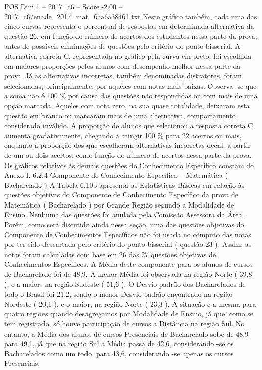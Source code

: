 \begin{textsample}{POS Dim 1 – 2017\_c6 – Score -2.00 – 2017\_c6/enade\_2017\_mat\_67a6a38461.txt}
Neste gráfico também, cada uma das cinco curvas representa o percentual de respostas em determinada alternativa da questão 26, em função do número de acertos dos estudantes nessa parte da prova, antes de possíveis eliminações de questões pelo critério do ponto-bisserial.
A alternativa correta C, representada no gráfico pela curva em preto, foi escolhida em maiores proporções pelos alunos com desempenho melhor nessa parte da prova.
Já as alternativas incorretas, também denominadas distratores, foram selecionadas, principalmente, por aqueles com notas mais baixas.
Observa -se que a soma não é 100 \% por causa das questões não respondidas ou com mais de uma opção marcada.
Aqueles com nota zero, na sua quase totalidade, deixaram esta questão em branco ou marcaram mais de uma alternativa, comportamento considerado inválido.
A proporção de alunos que selecionou a resposta correta C aumenta gradativamente, chegando a atingir 100 \% para 22 acertos ou mais, enquanto a proporção dos que escolheram alternativas incorretas decai, a partir de um ou dois acertos, como função do número de acertos nessa parte da prova.
Os gráficos relativos às demais questões do Conhecimento Específico constam do Anexo I. 6.2.4 Componente de Conhecimento Específico – Matemática ( Bacharelado ) A Tabela 6.10b apresenta as Estatísticas Básicas em relação às questões objetivas do Componente de Conhecimento Específico da prova de Matemática ( Bacharelado ) por Grande Região segundo a Modalidade de Ensino.
Nenhuma das questões foi anulada pela Comissão Assessora da Área.
Porém, como será discutido ainda nessa seção, uma das questões objetivas do Componente de Conhecimentos Específicos não foi usada no cômputo das notas por ter sido descartada pelo critério do ponto-bisserial ( questão 23 ).
Assim, as notas foram calculadas com base em 26 das 27 questões objetivas de Conhecimentos Específicos.
A Média deste componente para os alunos de cursos de Bacharelado foi de 48,9.
A menor Média foi observada na região Norte ( 39,8 ), e a maior, na região Sudeste ( 51,6 ).
O Desvio padrão dos Bacharelados de todo o Brasil foi 21,2, sendo o menor Desvio padrão encontrado na região Nordeste ( 20,1 ), e o maior, na região Norte ( 23,3 ).
A situação é a mesma para quatro regiões quando desagregamos por Modalidade de Ensino, já que, como se tem registrado, só houve participação de cursos a Distância na região Sul.
No entanto, a Média dos alunos de cursos Presenciais de Bacharelado sobe de 48,9 para 49,1, já que na região Sul a Média passa de 42,6, considerando -se os Bacharelados como um todo, para 43,6, considerando -se apenas os cursos Presenciais.

\end{textsample}
